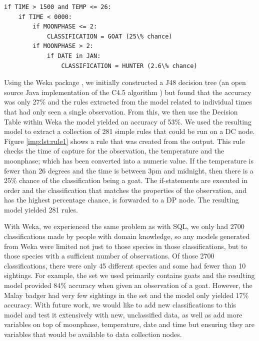 				\begin{lstlisting}[breaklines=true, caption={Example Rule created from Existing Data}, label={imp:lst:rule1}]
if TIME > 1500 and TEMP <= 26:
    if TIME < 0000:
        if MOONPHASE <= 2:
            CLASSIFICATION = GOAT (25\% chance)
        if MOONPHASE > 2:
            if DATE in JAN:
                CLASSIFICATION = HUNTER (2.6\% chance)
				\end{lstlisting}
			

			Using the Weka package \cite{hall2009weka}, we initially constructed a J48 decision tree (an open source Java implementation of the C4.5 algorithm \cite{quinlan93}) but found that the accuracy was only 27\% and the rules extracted from the model related to individual times that had only seen a single observation. From this, we then use the Decision Table \cite{Kohavi1995} within Weka the model yielded an accuracy of 53\%. We used the resulting model to extract a collection of 281 simple rules that could be run on a DC node. Figure \ref{imp:lst:rule1} shows a rule that was created from the output. This rule checks the time of capture for the observation, the temperature and the moonphase; which has been converted into a numeric value. If the temperature is fewer than 26 degrees and the time is between 3pm and midnight, then there is a 25\% chance of the classification being a goat. The if-statements are executed in order and the classification that matches the properties of the observation, and has the highest percentage chance, is forwarded to a DP node. The resulting model yielded 281 rules.

			With Weka, we experienced the same problem as with SQL, we only had 2700 classifications made by people with domain knowledge, so any models generated from Weka were limited not just to those species in those classifications, but to those species with a sufficient number of observations. Of those 2700 classifications, there were only 45 different species and some had fewer than 10 sightings. For example, the set we used primarily contains goats and the resulting model provided 84\% accuracy when given an observation of a goat. However, the Malay badger had very few sightings in the set and the model only yielded 17\% accuracy. With future work, we would like to add new classifications to this model and test it extensively with new, unclassified data, as well as add more variables on top of moonphase, temperature, date and time but ensuring they are variables that would be available to data collection nodes.
            
